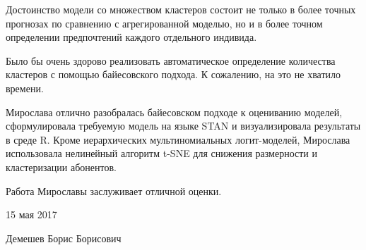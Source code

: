 \documentclass[a4paper, 12pt]{article}
\begin{document}
Достоинство модели со множеством кластеров состоит не только в более
точных прогнозах по сравнению с агрегированной моделью, но и в более
точном определении предпочтений каждого отдельного индивида.

Было бы очень здорово реализовать автоматическое определение количества
кластеров с помощью байесовского подхода. К сожалению, на это не хватило
времени.

Мирослава отлично разобралась байесовском подходе к оцениванию моделей,
сформулировала требуемую модель на языке STAN и визуализировала
результаты в среде R. Кроме иерархических мультиномиальных
логит-моделей, Мирослава использовала нелинейный алгоритм t-SNE для
снижения размерности и кластеризации абонентов.

Работа Мирославы заслуживает отличной оценки.

\vspace{1cm}

15 мая 2017

Демешев Борис Борисович
\end{document}
